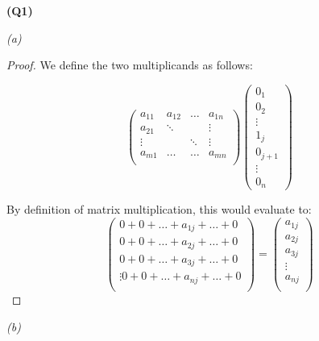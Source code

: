\documentclass[12pt, a4paper]{article}
\begin{document}
\textbf{(Q1)}

\textit{(a)}

\begin{proof}
    We define the two multiplicands as follows:

    \[
        \begin{pmatrix}
            a_{11} & a_{12} & \ldots & a_{1n}\\
            a_{21} & \ddots &        & \vdots\\
            \vdots &        & \ddots & \vdots\\
            a_{m1} & \ldots & \ldots & a_{mn}\\
        \end{pmatrix}
        \begin{pmatrix}
            0_1\\
            0_2\\
            \vdots\\
            1_j\\
            0_{j+1}\\
            \vdots\\
            0_n
        \end{pmatrix}
    \]

    By definition of matrix multiplication, this would evaluate to:
    \[
        \begin{pmatrix}
            0 + 0 + \ldots + a_{1j} + \ldots + 0\\
            0 + 0 + \ldots + a_{2j} + \ldots + 0\\
            0 + 0 + \ldots + a_{3j} + \ldots + 0\\
            \vdots
            0 + 0 + \ldots + a_{nj} + \ldots + 0\\
        \end{pmatrix}
        =
        \begin{pmatrix}
            a_{1j}\\
            a_{2j}\\
            a_{3j}\\
            \vdots\\
            a_{nj}\\
        \end{pmatrix}
    \]
\end{proof}

\textit{(b)}
\end{document}
